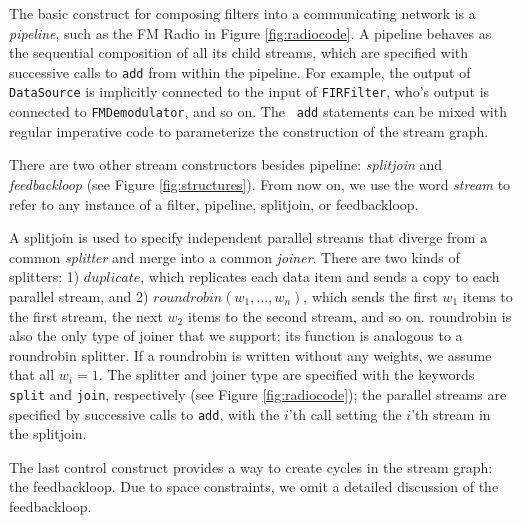 

The basic construct for composing filters into a communicating network
is a {\it pipeline}, such as the FM Radio in Figure
\ref{fig:radiocode}.  A pipeline behaves as the sequential composition
of all its child streams, which are specified with successive calls to
{\tt add} from within the pipeline.  For example, the output of {\tt
DataSource} is implicitly connected to the input of {\tt FIRFilter},
who's output is connected to {\tt FMDemodulator}, and so on.  The {\tt
add} statements can be mixed with regular imperative code to
parameterize the construction of the stream graph.

There are two other stream constructors besides pipeline: {\it
splitjoin} and {\it feedbackloop} (see Figure \ref{fig:structures}).
From now on, we use the word {\it stream} to refer to any instance of
a filter, pipeline, splitjoin, or feedbackloop.

A splitjoin is used to specify independent parallel streams that
diverge from a common {\it splitter} and merge into a common {\it
joiner}.  There are two kinds of splitters: 1) $duplicate$, which
replicates each data item and sends a copy to each parallel stream,
and 2) $roundrobin(w_1, \dots, w_n)$, which sends the first $w_1$
items to the first stream, the next $w_2$ items to the second stream,
and so on.  roundrobin is also the only type of joiner that we
support; its function is analogous to a roundrobin splitter.  If a
roundrobin is written without any weights, we assume that all $w_i =
1$.  The splitter and joiner type are specified with the keywords {\tt
split} and {\tt join}, respectively (see Figure \ref{fig:radiocode});
the parallel streams are specified by successive calls to {\tt add},
with the $i$'th call setting the $i$'th stream in the splitjoin.

The last control construct provides a way to create cycles in the
stream graph: the feedbackloop.  Due to space constraints, we omit a
detailed discussion of the feedbackloop.

